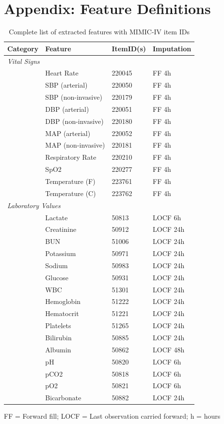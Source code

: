 \section{Appendix: Feature Definitions}

\begin{table}[H]
\centering
\caption{Complete list of extracted features with MIMIC-IV item IDs}
\label{tab:features_complete}
\small
\begin{tabular}{llll}
\toprule
\textbf{Category} & \textbf{Feature} & \textbf{ItemID(s)} & \textbf{Imputation} \\
\midrule
\multicolumn{4}{l}{\textit{Vital Signs}} \\
& Heart Rate & 220045 & FF 4h \\
& SBP (arterial) & 220050 & FF 4h \\
& SBP (non-invasive) & 220179 & FF 4h \\
& DBP (arterial) & 220051 & FF 4h \\
& DBP (non-invasive) & 220180 & FF 4h \\
& MAP (arterial) & 220052 & FF 4h \\
& MAP (non-invasive) & 220181 & FF 4h \\
& Respiratory Rate & 220210 & FF 4h \\
& SpO2 & 220277 & FF 4h \\
& Temperature (F) & 223761 & FF 4h \\
& Temperature (C) & 223762 & FF 4h \\
\midrule
\multicolumn{4}{l}{\textit{Laboratory Values}} \\
& Lactate & 50813 & LOCF 6h \\
& Creatinine & 50912 & LOCF 24h \\
& BUN & 51006 & LOCF 24h \\
& Potassium & 50971 & LOCF 24h \\
& Sodium & 50983 & LOCF 24h \\
& Glucose & 50931 & LOCF 24h \\
& WBC & 51301 & LOCF 24h \\
& Hemoglobin & 51222 & LOCF 24h \\
& Hematocrit & 51221 & LOCF 24h \\
& Platelets & 51265 & LOCF 24h \\
& Bilirubin & 50885 & LOCF 24h \\
& Albumin & 50862 & LOCF 48h \\
& pH & 50820 & LOCF 6h \\
& pCO2 & 50818 & LOCF 6h \\
& pO2 & 50821 & LOCF 6h \\
& Bicarbonate & 50882 & LOCF 24h \\
\bottomrule
\end{tabular}
\begin{tablenotes}
\small
\item FF = Forward fill; LOCF = Last observation carried forward; h = hours
\end{tablenotes}
\end{table}
